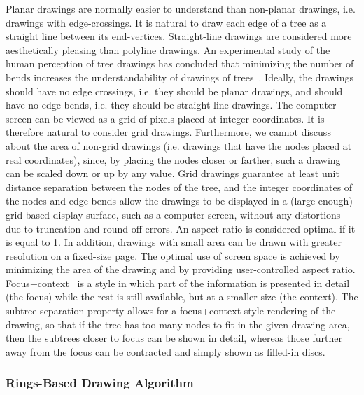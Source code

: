 \documentclass[]{article}
\begin{document}
{Planar drawings are normally easier to understand than non-planar
drawings, i.e. drawings with edge-crossings. It is natural to draw
each edge of a tree as a straight line between its end-vertices.
Straight-line drawings are considered more aesthetically pleasing
than polyline drawings. An experimental study of the human
perception of tree drawings has concluded that minimizing the
number of bends increases the understandability of drawings of
trees~\cite{p-97, pcj-97, tdb-88}. Ideally, the
drawings should have no edge crossings, i.e. they should be planar
drawings, and should have no edge-bends, i.e. they should be
straight-line drawings. The computer screen can be viewed as a
grid of pixels placed at integer coordinates. It is therefore
natural to consider grid drawings. Furthermore, we cannot discuss
about the area of non-grid drawings (i.e. drawings that have the
nodes placed at real coordinates), since, by placing the nodes
closer or farther,  such a drawing can be scaled down or up by any
value. Grid drawings guarantee at least unit distance separation
between the nodes of the tree, and the integer coordinates of the
nodes and edge-bends allow the drawings to be displayed in a
(large-enough) grid-based display surface, such as a computer
screen, without any distortions due to truncation and round-off
errors.
An aspect ratio is considered optimal if it is equal to 1.
In addition, drawings with
small area can be drawn  with greater resolution on a fixed-size
page. The optimal use of screen space is achieved by minimizing
the area of the drawing and by providing user-controlled aspect
ratio.
Focus+context~\cite{sb-94} is a style in which part of the
information is presented in detail (the focus) while the rest is
still available, but at a smaller size (the context). The
subtree-separation property allows for a focus+context style
rendering of the drawing, so that if the tree has too many nodes
to fit in the given drawing area, then the subtrees closer to
focus can be shown in detail, whereas those further away from the
focus can be contracted and simply shown as filled-in discs.

\subsubsection{Rings-Based Drawing Algorithm}
\label{se:rings}

}
\end{document}
